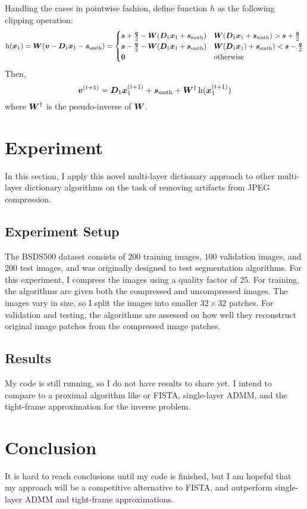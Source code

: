 Handling the cases in pointwise fashion, define function $h$ as the following clipping operation:
%
\begin{equation}
\operatorname{h}(\bm{x}_1) = \bm{W}(\bm{v} - \bm{D}_1\bm{x}_1 - \bm{s}_{\textrm{smth}}) = \begin{cases} \bm{s} + \frac{\bm{q}}{2} - \bm{W}(\bm{D}_1\bm{x}_1 + \bm{s}_{\textrm{smth}}) & \bm{W}(\bm{D}_1\bm{x}_1 + \bm{s}_{\textrm{smth}}) > \bm{s} + \frac{\bm{q}}{2} \\ \bm{s} - \frac{\bm{q}}{2} - \bm{W}(\bm{D}_1\bm{x}_1 + \bm{s}_{\textrm{smth}}) & \bm{W}(\bm{D}_1\bm{x}_1) + \bm{s}_{\textrm{smth}}) < \bm{s} - \frac{\bm{q}}{2} \\ \bm{0} & \text{otherwise}
\end{cases}
\end{equation}
%
Then,
\begin{equation}
\bm{v}^{(t + 1)} = \bm{D}_1\bm{x}_1^{(t + 1)} + \bm{s}_{\text{smth}} + \bm{W}^{\dagger}\operatorname{h}(\bm{x}_1^{(t + 1)})
\end{equation}
where $\bm{W}^{\dagger}$ is the pseudo-inverse of $\bm{W}$.


\section{Experiment}
In this section, I apply this novel multi-layer dictionary approach to other multi-layer dictionary algorithms on the task of removing artifacts from JPEG compression.
\subsection{Experiment Setup}
The BSDS500 dataset consists of $200$ training images, $100$ validation images, and $200$ test images, and was originally designed to test segmentation algorithms. For this experiment, I compress the images using a quality factor of $25$. For training, the algorithms are given both the compressed and uncompressed images. The images vary in size, so I split the images into smaller $32 \times 32$ patches. For validation and testing, the algorithms are assessed on how well they reconstruct original image patches from the compressed image patches.
\subsection{Results}
My code is still running, so I do not have results to share yet.  I intend to compare to a proximal algorithm like \cite{chodosh2020use} or FISTA, single-layer ADMM, and the tight-frame approximation for the inverse problem.
\section{Conclusion}
It is hard to reach conclusions until my code is finished, but I am hopeful that my approach will be a competitive alternative to FISTA, and outperform single-layer ADMM and tight-frame approximations.
